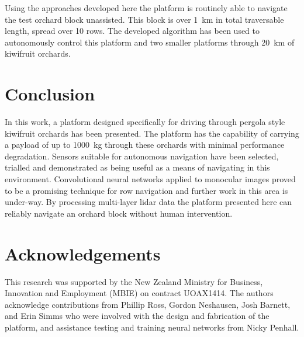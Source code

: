 \documentclass[preprint,authoryear,12pt]{elsarticle}
\begin{document}
    Using the approaches developed here the platform is routinely able to navigate the test orchard block unassisted.
    This block is over \SI{1}{\kilo\meter} in total traversable length, spread over 10 rows.
    The developed algorithm has been used to autonomously control this platform and two smaller platforms through \SI{20}{\kilo\meter} of kiwifruit orchards.


\section{Conclusion}
    In this work, a platform designed specifically for driving through pergola style kiwifruit orchards has been presented.
    The platform has the capability of carrying a payload of up to \SI{1000}{\kilo\gram} through these orchards with minimal performance degradation.
    Sensors suitable for autonomous navigation have been selected, trialled and demonstrated as being useful as a means of navigating in this environment.
    Convolutional neural networks applied to monocular images proved to be a promising technique for row navigation and further work in this area is under-way.
    By processing multi-layer lidar data the platform presented here can reliably navigate an orchard block without human intervention.


\section*{Acknowledgements}
This research was supported by the New Zealand Ministry for Business, Innovation and Employment (MBIE) on contract UOAX1414.
The authors acknowledge contributions from Phillip Ross, Gordon Neshausen, Josh Barnett, and Erin Simms who were involved with the design and fabrication of the platform, and assistance testing and training neural networks from Nicky Penhall.


\end{document}
